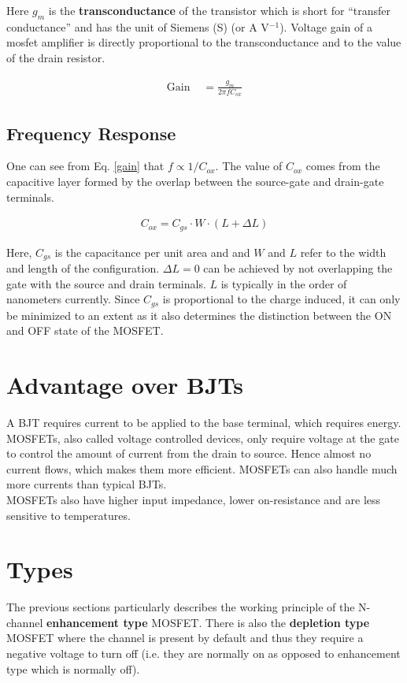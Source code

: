 Here $g_m$ is the \textbf{transconductance} of the transistor which is short for “transfer conductance” and has the unit of Siemens (S) (or A V$^{-1}$). Voltage gain of a mosfet amplifier is directly proportional to the transconductance and to the value of the drain resistor.

\begin{align}
    \text{Gain } &= \frac{g_m}{2 \pi f C_{ox}} \label{gain}
\end{align}

\subsection*{Frequency Response}
One can see from Eq. \ref{gain} that $f \propto 1/C_{ox}$. 
The value of $C_{ox}$ comes from the capacitive layer formed by the overlap between the source-gate and drain-gate terminals.

\begin{align*}
    C_{ox} = C_{gs} \cdot W \cdot (L+\Delta L)
\end{align*}

Here, $C_{gs}$ is the capacitance per unit area and and $W$ and $L$ refer to the width and length of the configuration. $\Delta L = 0$ can be achieved by not overlapping the gate with the source and drain terminals. $L$ is typically in the order of nanometers currently. Since $C_{gs}$ is proportional to the charge induced, it can only be minimized to an extent as it also determines the distinction between the ON and OFF state of the MOSFET.

\section*{Advantage over BJTs}
A BJT requires current to be applied to the base terminal, which requires energy.
MOSFETs, also called voltage controlled devices, only require voltage at the gate to control the amount of current from the drain to source. Hence almost no current flows, which makes them more efficient. MOSFETs can also handle much more currents than typical BJTs.\\

MOSFETs also have higher input impedance, lower on-resistance and are less sensitive to temperatures.

\section*{Types}
The previous sections particularly describes the working principle of the N-channel \textbf{enhancement type} MOSFET. There is also the \textbf{depletion type} MOSFET where the channel is present by default and thus they require a negative voltage to turn off (i.e. they are normally on as opposed to enhancement type which is normally off).\\

